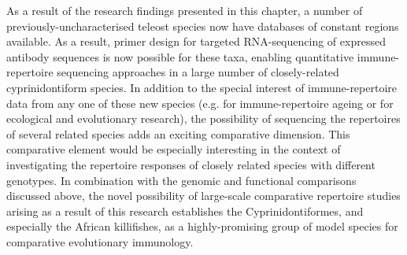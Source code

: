 As a result of the research findings presented in this chapter, a number of previously-uncharacterised teleost species now have databases of constant regions available. As a result, primer design for targeted RNA-sequencing of expressed antibody sequences is now possible for these taxa, enabling quantitative immune-repertoire sequencing approaches in a large number of closely-related cyprinidontiform species. In addition to the special interest of immune-repertoire data from any one of these new species (e.g. \Nfu for immune-repertoire ageing or \Xma for ecological and evolutionary research), the possibility of sequencing the repertoires of several related species adds an exciting comparative dimension. This comparative element would be especially interesting in the context of investigating the repertoire responses of closely related species with different  genotypes. In combination with the genomic and functional comparisons discussed above, the novel possibility of large-scale comparative repertoire studies arising as a result of this research establishes the Cyprinidontiformes, and especially the African killifishes, as a highly-promising group of model species for comparative evolutionary immunology.

